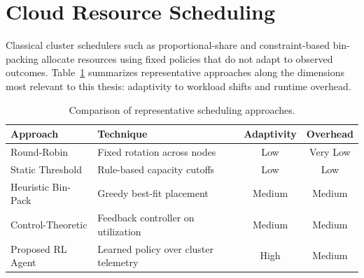 \section{Cloud Resource Scheduling}
Classical cluster schedulers such as proportional-share and
constraint-based bin-packing allocate resources using fixed policies that
do not adapt to observed outcomes. Table~\ref{tab:related} summarizes
representative approaches along the dimensions most relevant to this
thesis: adaptivity to workload shifts and runtime overhead.

\begin{table}[htbp]
\centering
\caption{Comparison of representative scheduling approaches.}
\label{tab:related}
\begin{tabularx}{\textwidth}{@{}l X c c@{}}
\toprule
\textbf{Approach} & \textbf{Technique} & \textbf{Adaptivity} & \textbf{Overhead} \\
\midrule
Round-Robin        & Fixed rotation across nodes            & Low    & Very Low \\
\rowcolor{softGreen}
Static Threshold    & Rule-based capacity cutoffs             & Low    & Low \\
Heuristic Bin-Pack  & Greedy best-fit placement               & Medium & Medium \\
\rowcolor{softGreen}
Control-Theoretic   & Feedback controller on utilization       & Medium & Medium \\
Proposed RL Agent   & Learned policy over cluster telemetry    & High   & Medium \\
\bottomrule
\end{tabularx}
\end{table}
